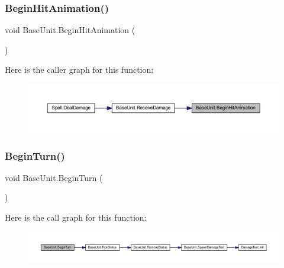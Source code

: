 \subsubsection{\texorpdfstring{BeginHitAnimation()}{BeginHitAnimation()}}
{\footnotesize\ttfamily void Base\+Unit.\+Begin\+Hit\+Animation (\begin{DoxyParamCaption}{ }\end{DoxyParamCaption})}

Here is the caller graph for this function\+:
\nopagebreak
\begin{figure}[H]
\begin{center}
\leavevmode
\includegraphics[width=350pt]{class_base_unit_a01c63c5cd0d41b5ca787470fd0c19472_icgraph}
\end{center}
\end{figure}
\mbox{\label{class_base_unit_a0f8955c72dfa02027c1b247d74233f0d}} 
\subsubsection{\texorpdfstring{BeginTurn()}{BeginTurn()}}
{\footnotesize\ttfamily void Base\+Unit.\+Begin\+Turn (\begin{DoxyParamCaption}{ }\end{DoxyParamCaption})}

Here is the call graph for this function\+:
\nopagebreak
\begin{figure}[H]
\begin{center}
\leavevmode
\includegraphics[width=350pt]{class_base_unit_a0f8955c72dfa02027c1b247d74233f0d_cgraph}
\end{center}
\end{figure}
\mbox{\label{class_base_unit_a5fb838313b1a61dbf38d440c2a12667e}} 
